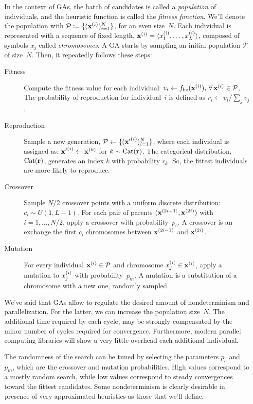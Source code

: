 In the context of GAs, the batch of candidates is called a \emph{population}
of individuals, and the heuristic function is called the \emph{fitness
function}. We'll denote the population with $\mathcal{P} \coloneqq
\{(\mathbf{x}^{(i)})_{i=1}^N\}$, for an even size~$N$. Each individual is
represented with a sequence of fixed length, $\mathbf{x}^{(i)} = \langle
x_1^{(i)}, \dots, x_L^{(i)} \rangle$, composed of symbols $x_j$ called
\emph{chromosomes}. A GA starts by sampling an initial population
$\mathcal{P}$ of size~$N$. Then, it repeatedly follows these steps:
\begin{description}
	\item [Fitness] Compute the fitness value for each individual: $v_i \gets
		f_{\text{he}}(\mathbf{x}^{(i)}), \, \forall\, \mathbf{x}^{(i)} \in \mathcal{P}$.
		The probability of reproduction for individual~$i$ is defined as $r_i
		\gets v_i / \sum_j v_j$.
	\item [Reproduction] Sample a new generation, $\mathcal{P} \gets
		\{({\mathbf{x}'}^{(i)})_{i=1}^N\}$, where each individual is assigned as:
		${\mathbf{x}'}^{(i)} \gets \mathbf{x}^{(k)}$ for $k \sim \operatorname{Cat}(\mathbf{r})$. The
		categorical distribution, $\operatorname{Cat}(\mathbf{r})$, generates an index $k$ with
		probability $r_k$.  So, the fittest individuals are more likely to
		reproduce.
	\item [Crossover] Sample $N/2$ crossover points with a uniform discrete
		distribution: ${c_i \sim U(1, L-1)}$. For each pair of parents
		$(\mathbf{x}^{(2i-1)}, \mathbf{x}^{(2i)})$ with $i=1, \dots, N/2$, apply a crossover
		with probability~$p_c$. A crossover is an exchange the first $c_i$
		chromosomes between $\mathbf{x}^{(2i-1)}$ and $\mathbf{x}^{(2i)}$.
	\item [Mutation] For every individual $\mathbf{x}^{(i)} \in \mathcal{P}$ and
		chromosome $x_j^{(i)} \in \mathbf{x}^{(i)}$, apply a mutation to
		$x_j^{(i)}$ with probability~$p_m$. A mutation is a substitution of a
		chromosome with a new one, randomly sampled.
\end{description}

We've said that GAs allow to regulate the desired amount of nondeterminism and
parallelization. For the latter, we can increase the population size~$N$.  The
additional time required by each cycle, may be strongly compensated by the
minor number of cycles required for convergence.  Furthermore, modern parallel
computing libraries will show a very little overhead each additional
individual.

The randomness of the search can be tuned by selecting the parameters $p_c$
and $p_m$, which are the crossover and mutation probabilities. High values
correspond to a mostly random search, while low values correspond to steady
convergences toward the fittest candidates. Some nondeterminism is clearly
desirable in presence of very approximated heuristics as those that we'll
define.

